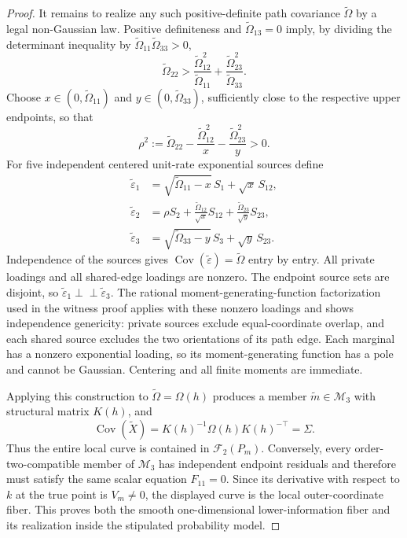 \documentclass{article}
\begin{document}
\begin{proof}
It remains to realize any such positive-definite path covariance \(\widetilde\Omega\) by a legal non-Gaussian law. Positive definiteness and \(\widetilde\Omega_{13}=0\) imply, by dividing the determinant inequality by \(\widetilde\Omega_{11}\widetilde\Omega_{33}>0\),
\[
\widetilde\Omega_{22}>
\frac{\widetilde\Omega_{12}^2}{\widetilde\Omega_{11}}
+\frac{\widetilde\Omega_{23}^2}{\widetilde\Omega_{33}}.
\]
Choose \(x\in(0,\widetilde\Omega_{11})\) and \(y\in(0,\widetilde\Omega_{33})\), sufficiently close to the respective upper endpoints, so that
\[
\rho^2:=\widetilde\Omega_{22}
-\frac{\widetilde\Omega_{12}^2}{x}
-\frac{\widetilde\Omega_{23}^2}{y}>0.
\]
For five independent centered unit-rate exponential sources define
\[
\begin{aligned}
\widetilde\varepsilon_1
 &=\sqrt{\widetilde\Omega_{11}-x}\,S_1+\sqrt{x}\,S_{12},\\
\widetilde\varepsilon_2
 &=\rho S_2+\frac{\widetilde\Omega_{12}}{\sqrt{x}}S_{12}
                 +\frac{\widetilde\Omega_{23}}{\sqrt{y}}S_{23},\\
\widetilde\varepsilon_3
 &=\sqrt{\widetilde\Omega_{33}-y}\,S_3+\sqrt{y}\,S_{23}.
\end{aligned}
\]
Independence of the sources gives \(\operatorname{Cov}(\widetilde\varepsilon)=\widetilde\Omega\) entry by entry. All private loadings and all shared-edge loadings are nonzero. The endpoint source sets are disjoint, so \(\widetilde\varepsilon_1\perp\!\!\!\perp\widetilde\varepsilon_3\). The rational moment-generating-function factorization used in the witness proof applies with these nonzero loadings and shows independence genericity: private sources exclude equal-coordinate overlap, and each shared source excludes the two orientations of its path edge. Each marginal has a nonzero exponential loading, so its moment-generating function has a pole and cannot be Gaussian. Centering and all finite moments are immediate.

Applying this construction to \(\widetilde\Omega=\Omega(h)\) produces a member \(\widetilde m\in\mathcal M_3\) with structural matrix \(K(h)\), and
\[
\operatorname{Cov}(\widetilde X)
=K(h)^{-1}\Omega(h)K(h)^{-\top}=\Sigma.
\]
Thus the entire local curve is contained in \(\mathcal F_2(P_m)\). Conversely, every order-two-compatible member of \(\mathcal M_3\) has independent endpoint residuals and therefore must satisfy the same scalar equation \(F_{11}=0\). Since its derivative with respect to \(k\) at the true point is \(V_m\neq0\), the displayed curve is the local outer-coordinate fiber. This proves both the smooth one-dimensional lower-information fiber and its realization inside the stipulated probability model.
\end{proof}
\end{document}
